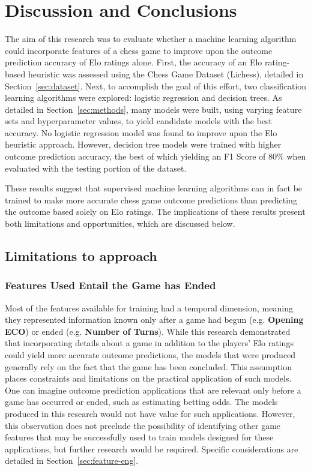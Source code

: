 \documentclass[12pt]{article}
\begin{document}
\section{Discussion and Conclusions}
\label{sec:discussion}

The aim of this research was to evaluate whether a machine learning algorithm could incorporate features of a chess game to improve upon the outcome prediction accuracy of Elo ratings alone. First, the accuracy of an Elo rating-based heuristic was assessed using the Chess Game Dataset (Lichess), detailed in Section~\ref{sec:dataset}. Next, to accomplish the goal of this effort, two classification learning algorithms were explored: logistic regression and decision trees. As detailed in Section~\ref{sec:methods}, many models were built, using varying feature sets and hyperparameter values, to yield candidate models with the best accuracy. No logistic regression model was found to improve upon the Elo heuristic approach. However, decision tree models were trained with higher outcome prediction accuracy, the best of which yielding an F1 Score of $80\%$ when evaluated with the testing portion of the dataset.

These results suggest that supervised machine learning algorithms can in fact be trained to make more accurate chess game outcome predictions than predicting the outcome based solely on Elo ratings. The implications of these results present both limitations and opportunities, which are discussed below.

\subsection{Limitations to approach}

\subsubsection{Features Used Entail the Game has Ended}
Most of the features available for training had a temporal dimension, meaning they represented information known only after a game had begun (e.g. \textbf{Opening ECO}) or ended (e.g. \textbf{Number of Turns}). While this research demonstrated that incorporating details about a game in addition to the players' Elo ratings could yield more accurate outcome predictions, the models that were produced generally rely on the fact that the game has been concluded. This assumption places constraints and limitations on the practical application of such models. One can imagine outcome prediction applications that are relevant only before a game has occurred or ended, such as estimating betting odds. The models produced in this research would not have value for such applications. However, this observation does not preclude the possibility of identifying other game features that may be successfully used to train models designed for these applications, but further research would be required. Specific considerations are detailed in Section~\ref{sec:feature-eng}.
\end{document}
